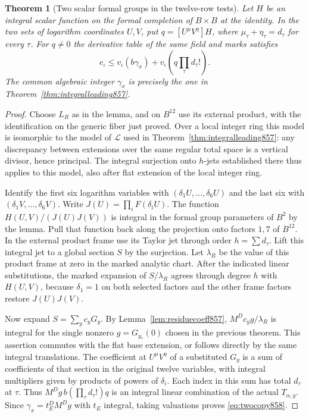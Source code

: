 \documentclass[a4paper,11pt]{article}
\newtheorem{theorem}[proposition]{Theorem}
\theoremstyle{definition}
\theoremstyle{remark}
\numberwithin{equation}{section}
\begin{document}
\begin{theorem}[Two scalar formal groups in the twelve-row tests]
\leavevmode\label{thm:twocopy858}
Let \(H\) be an integral scalar function on the formal completion
of \(B\times B\) at the identity. In the two sets of logarithm
coordinates \(U,V\), put
\(q=[U^\mu V^\eta]H\), where
\(\mu_\tau+\eta_\tau=d_\tau\) for every \(\tau\).
For \(q\ne0\) the derivative table of the same field and marks
satisfies
\begin{equation}
          e_\iota\le v_\iota(b\gamma_x)
                         + v_\iota\!\left(q\prod_\tau d_\tau!\right).
 \label{eq:twocopy858}
\end{equation}
The common algebraic integer \(\gamma_x\) is precisely the
one in Theorem~\ref{thm:integralleading857}.
\end{theorem}
\begin{proof}
Choose \(L_R\) as in the lemma, and on \(B^{12}\) use its
external product, with the identification on the generic
fiber just proved. Over a local integer ring this model is
isomorphic to the model of \(\mathcal L\) used in
Theorem~\ref{thm:integralleading857}: any discrepancy between
extensions over the same regular total space is a vertical
divisor, hence principal. The integral surjection onto
\(h\)-jets established there thus applies to this model,
also after flat extension of the local integer ring.

Identify the first six logarithm variables with
\((\delta_1 U,\ldots,\delta_6 U)\) and the last six with
\((\delta_1 V,\ldots,\delta_6 V)\). Write
\(J(U)=\prod_i F(\delta_i U)\).
The function \(H(U,V)/(J(U)J(V))\) is integral in the
formal group parameters of \(B^2\) by the lemma. Pull
that function back along the projection onto factors \(1,7\)
of \(B^{12}\). In the external product frame use its Taylor
jet through order \(h=\sum d_\tau\). Lift this integral jet
to a global section \(S\) by the surjection. Let \(\lambda_R\)
be the value of this product frame at zero in the marked
analytic chart. After the indicated linear substitutions,
the marked expansion of \(S/\lambda_R\) agrees through degree
\(h\) with \(H(U,V)\), because \(\delta_1=1\) on both selected
factors and the other frame factors restore \(J(U)J(V)\).

Now expand \(S=\sum_y c_y G_y\). By
Lemma~\ref{lem:residuecoeff857}, \(M^D c_yg/\lambda_R\) is
integral for the single nonzero \(g=G_{y_*}(0)\) chosen in
the previous theorem. This assertion commutes with the flat
base extension, or follows directly by the same integral
translations. The coefficient at \(U^\mu V^\eta\) of a
substituted \(G_y\) is a sum of coefficients of that section
in the original twelve variables, with integral multipliers
given by products of powers of \(\delta_i\). Each index in
this sum has total \(d_\tau\) at \(\tau\). Thus
\(M^Dg\,b(\prod_\tau d_\tau!)q\) is an integral linear
combination of the actual \(T_{\alpha,y}\).
Since \(\gamma_x=t_E^D M^Dg\) with \(t_E\) integral, taking
valuations proves \eqref{eq:twocopy858}.
\end{proof}
\end{document}
